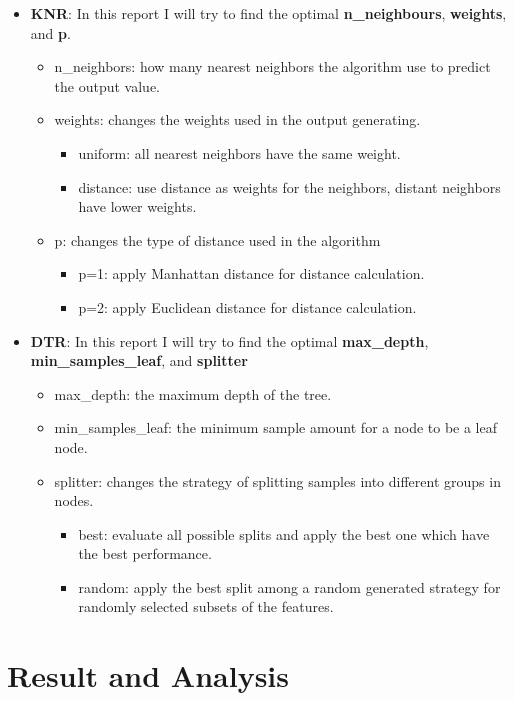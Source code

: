 \documentclass[a4paper]{article}
\begin{document}
\begin{itemize}
    \item \textbf{KNR}: In this report I will try to find the optimal \textbf{n\_neighbours}, \textbf{weights}, and \textbf{p}. 
    \begin{itemize}
        \item n\_neighbors: how many nearest neighbors the algorithm use to predict the output value.
        \item weights: changes the weights used in the output generating.
    
        \begin{itemize}
            \item uniform: all nearest neighbors have the same weight.
            \item distance: use distance as weights for the neighbors, distant neighbors have lower weights. 
        \end{itemize}

        \item p: changes the type of distance used in the algorithm
        \begin{itemize}
            \item p=1: apply Manhattan distance for distance calculation.
            \item p=2: apply Euclidean distance for distance calculation. 
        \end{itemize}
        
    \end{itemize}

    \item \textbf{DTR}: In this report I will try to find the optimal \textbf{max\_depth}, \textbf{min\_samples\_leaf}, and \textbf{splitter}
    \begin{itemize}
        \item max\_depth: the maximum depth of the tree.
        \item min\_samples\_leaf: the minimum sample amount for a node to be a leaf node.
        \item splitter: changes the strategy of splitting samples into different groups in nodes.
        \begin{itemize}
            \item best: evaluate all possible splits and apply the best one which have the best performance.
            \item random: apply the best split among a random generated strategy for randomly selected subsets of the features.
        \end{itemize}
        
    \end{itemize}
\end{itemize}

\subsection{}

\section{Result and Analysis}
\end{document}

